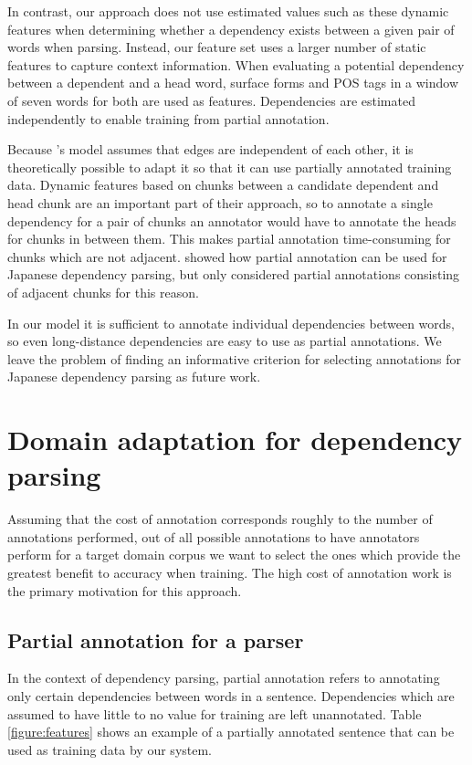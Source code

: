 \documentclass[english]{jnlp_1.4}
\begin{document}
In contrast, our approach does not use estimated values such as these
dynamic features when determining whether a dependency exists between
a given pair of words when parsing. Instead, our feature set uses a
larger number of static features to capture context information. When
evaluating a potential dependency between a dependent and a head word,
surface forms and POS tags in a window of seven words for both are
used as features. Dependencies are estimated independently to enable
training from partial annotation.

Because 's model assumes that edges are independent
of each other, it is theoretically possible to adapt it so that it can
use partially annotated training data. Dynamic features based on
chunks between a candidate dependent and head chunk are an important
part of their approach, so to annotate a single dependency for a pair
of chunks an annotator would have to annotate the heads for chunks in
between them. This makes partial annotation time-consuming for chunks
which are not adjacent.   showed how partial
annotation can be used for Japanese dependency parsing, but only
considered partial annotations consisting of adjacent chunks for this
reason.

In our model it is sufficient to annotate individual dependencies
between words, so even long-distance dependencies are easy to use as
partial annotations. We leave the problem of finding an informative
criterion for selecting annotations for Japanese dependency parsing as
future work.



\section{Domain adaptation for dependency parsing}
\label{sec:adaptation}

Assuming that the cost of annotation corresponds roughly to the number of annotations performed, out
of all possible annotations to have annotators perform for a target domain corpus we want to select
the ones which provide the greatest benefit to accuracy when training. The high cost of annotation work is the
primary motivation for this approach.


\subsection{Partial annotation for a parser}

In the context of dependency parsing, partial annotation refers to annotating only certain
dependencies between words in a sentence. Dependencies which are assumed to have little to no value
for training are left unannotated. Table \ref{figure:features} shows an example of a partially annotated
sentence that can be used as training data by our system.
\end{document}
